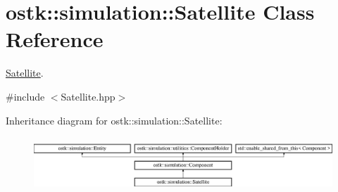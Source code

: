 \hypertarget{classostk_1_1simulation_1_1_satellite}{}\section{ostk\+:\+:simulation\+:\+:Satellite Class Reference}
\label{classostk_1_1simulation_1_1_satellite}


\hyperlink{classostk_1_1simulation_1_1_satellite}{Satellite}.  




{\ttfamily \#include $<$Satellite.\+hpp$>$}

Inheritance diagram for ostk\+:\+:simulation\+:\+:Satellite\+:\begin{figure}[H]
\begin{center}
\leavevmode
\includegraphics[height=2.066421cm]{classostk_1_1simulation_1_1_satellite}
\end{center}
\end{figure}
